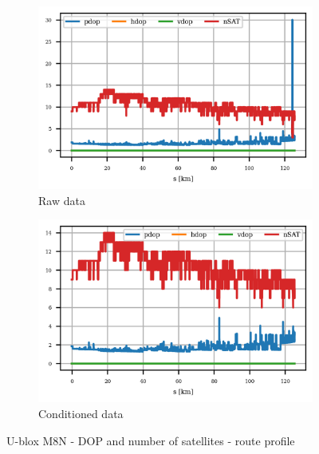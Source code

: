 \documentclass{article}
\begin{document}
			\begin{figure}[h]
		    	\centering
		     	\begin{subfigure}[b]{0.45\textwidth}
		      		\centering
		      	   \includegraphics[width=\textwidth]{Route/raw_dop_U-blox M8N.png}
		      	   \caption{Raw data}
		      	   \label{fig:Gadget1_raw_dop}
		     	\end{subfigure}
		     	\begin{subfigure}[b]{0.45\textwidth}
		      	   \centering
		      	   \includegraphics[width=\textwidth]{Route/cond_dop_U-blox M8N.png}
		      	   \caption{Conditioned data}
		      	   \label{fig:Gadget1_cond_dop}
		     	\end{subfigure}
		      \caption{U-blox M8N - DOP and number of satellites - route profile}
		      \label{fig:Gadget1_dop}
			\end{figure}
\end{document}
